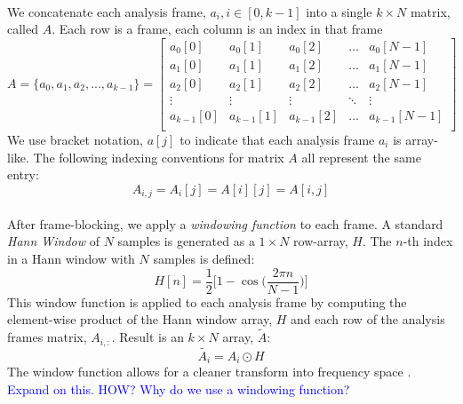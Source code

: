 \documentclass[12pt,letterpaper]{article}
\begin{document}
\paragraph*{}We concatenate each analysis frame, $a_{i}, i \in [0,k-1]$ into a single $k \times N$ matrix, called $A$. Each row is a frame, each column is an index in that frame
\begin{equation}
\label{eqn-FrameMatrix}
A = \big\{ a_{0} , a_{1} , a_{2} , ... , a_{k-1} \big\} = 
\begin{bmatrix}
a_{0}[0] & a_{0}[1] & a_{0}[2] & \hdots & a_{0}[N-1] \\
a_{1}[0] & a_{1}[1] & a_{1}[2] & \hdots & a_{1}[N-1] \\
a_{2}[0] & a_{2}[1] & a_{2}[2] & \hdots & a_{2}[N-1] \\
\vdots 		& \vdots 	  & \vdots 		& \ddots & \vdots        \\
a_{k-1}[0] & a_{k-1}[1] & a_{k-1}[2] & \hdots & a_{k-1}[N-1] \\
\end{bmatrix}
\end{equation}
We use bracket notation, $a[j]$ to indicate that each analysis frame $a_i$ is array-like. The following indexing conventions for matrix $A$ all represent the same entry:
\begin{equation}
\label{eqn-IndexingA}
A_{i,j} = A_i[j] = A[i][j] = A[i,j]
\end{equation}

\paragraph*{}After frame-blocking, we apply a \textit{windowing function} to each frame. A standard \textit{Hann Window} of $N$ samples is generated as a $1 \times N$ row-array, $H$. The $n$-th index in a Hann window with $N$ samples is defined:
\begin{equation}
\label{eqn-Hann}
H[n] = \frac{1}{2}\bigg[ 1 - \cos\Big( \frac{2\pi n}{N-1}\Big)\bigg]
\end{equation}
This window function is applied to each analysis frame by computing the element-wise product of the Hann window array, $H$ and each row of the analysis frames matrix, $A_{i,:}$. Result is an $k \times N$ array, $\widetilde{A}$:
\begin{equation}
\label{eqn-WindowMatrix}
\widetilde{A_i} = A_i \odot H
\end{equation}
The window function allows for a cleaner transform into frequency space \cite{Virtanen}. \textcolor{blue}{Expand on this. HOW? Why do we use a windowing function?}
\end{document}
